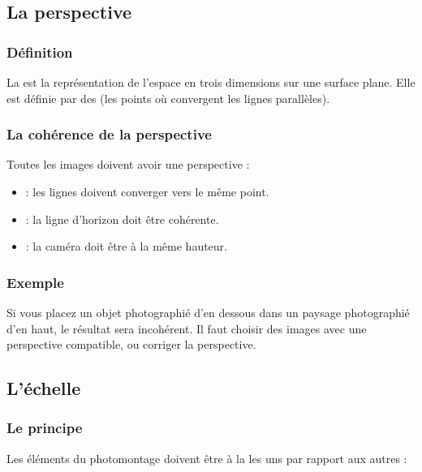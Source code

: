 \subsection{La perspective}

\subsubsection{Définition}

La  est la représentation de l'espace en trois dimensions sur une surface plane. Elle est définie par des  (les points où convergent les lignes parallèles).

\subsubsection{La cohérence de la perspective}

Toutes les images doivent avoir une perspective  :

\begin{itemize}
    \item {} : les lignes doivent converger vers le même point.
    \item {} : la ligne d'horizon doit être cohérente.
    \item {} : la caméra doit être à la même hauteur.
\end{itemize}

\subsubsection{Exemple}

Si vous placez un objet photographié d'en dessous dans un paysage photographié d'en haut, le résultat sera incohérent. Il faut choisir des images avec une perspective compatible, ou corriger la perspective.

\subsection{L'échelle}

\subsubsection{Le principe}

Les éléments du photomontage doivent être à la  les uns par rapport aux autres :

